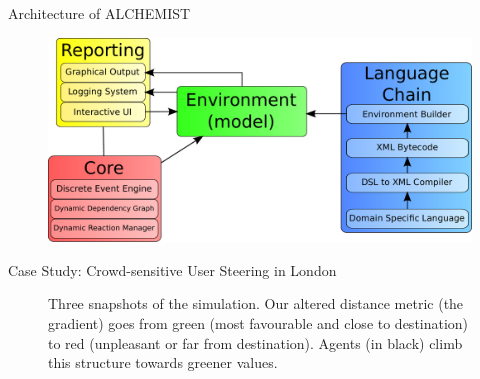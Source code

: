 \documentclass[presentation]{beamer} %
\newcommand{\alchemist}{{\sf ALCHEMIST}}
\begin{document}
\begin{frame}{Architecture of \alchemist{}}
  \begin{figure}
    \includegraphics[width=\textwidth]{imgs/architecture} 
  \end{figure}
\end{frame}

\begin{frame}{Case Study: Crowd-sensitive User Steering in London}
\begin{figure}[bt]\centering
  \caption{Three snapshots of the simulation. Our altered distance metric (the gradient) goes from green (most favourable and close to destination) to red (unpleasant or far from destination). Agents (in black) climb this structure towards greener values.}
\end{figure}
\end{frame}
\end{document}
